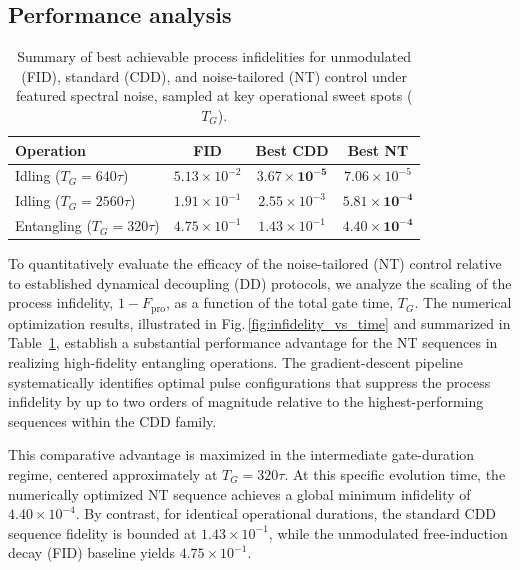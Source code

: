 \documentclass[%
 reprint,
superscriptaddress,
 amsmath,amssymb,
 aps,
pra,
floatfix,
]{revtex4-2}
\newcommand{\qk}[1]{{\color{OliveGreen}#1}}
\begin{document}

\subsection{Performance analysis}

\begin{table}[!h]
    \centering
    \caption{\qk{Summary of best achievable process infidelities for unmodulated (FID), standard (CDD), and noise-tailored (NT) control under featured spectral noise, sampled at key operational sweet spots ($T_G$).}}
    \label{tab:fidelity_summary}
    \renewcommand{\arraystretch}{1.3}
    \begin{tabular*}{\linewidth}{@{\extracolsep{\fill}}lccc@{}}
        \toprule
        \textbf{Operation} & \textbf{FID} & \textbf{Best CDD} & \textbf{Best NT} \\
        \midrule
        Idling ($T_G = 640\tau$) & $5.13 \times 10^{-2}$ & $\mathbf{3.67 \times 10^{-5}}$ & $7.06 \times 10^{-5}$ \\
        Idling ($T_G = 2560\tau$) & $1.91 \times 10^{-1}$ & $2.55 \times 10^{-3}$ & $\mathbf{5.81 \times 10^{-4}}$ \\
        Entangling ($T_G = 320\tau$) & $4.75 \times 10^{-1}$ & $1.43 \times 10^{-1}$ & $\mathbf{4.40 \times 10^{-4}}$ \\
        \bottomrule
    \end{tabular*}
\end{table}

To quantitatively evaluate the efficacy of the noise-tailored (NT) control relative to established dynamical decoupling (DD) protocols, we analyze the scaling of the process infidelity, $1 - F_{\text{pro}}$, as a function of the total gate time, $T_G$. The numerical optimization results, illustrated in Fig.\,\ref{fig:infidelity_vs_time} and summarized in Table~\ref{tab:fidelity_summary}, establish a substantial performance advantage for the NT sequences in realizing high-fidelity entangling operations. The gradient-descent pipeline systematically identifies optimal pulse configurations that suppress the process infidelity by up to two orders of magnitude relative to the highest-performing sequences within the CDD family.

This comparative advantage is maximized in the intermediate gate-duration regime, centered approximately at $T_G = 320\tau$. At this specific evolution time, the numerically optimized NT sequence achieves a global minimum infidelity of $4.40 \times 10^{-4}$. By contrast, for identical operational durations, the standard CDD sequence fidelity is bounded at $1.43 \times 10^{-1}$, while the unmodulated free-induction decay (FID) baseline yields $4.75 \times 10^{-1}$. 
\end{document}
